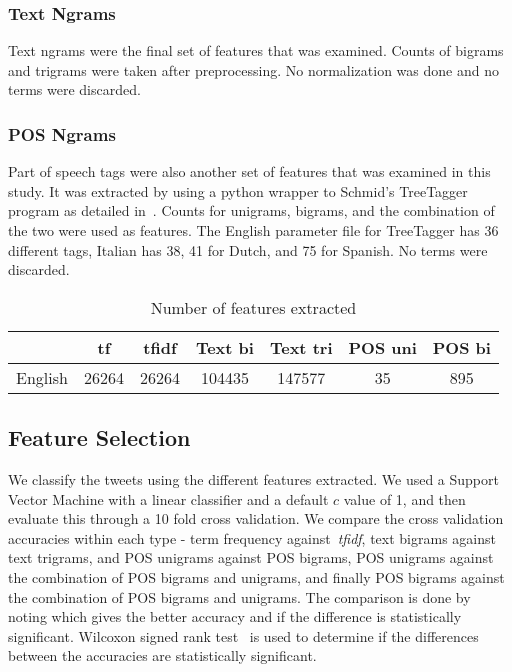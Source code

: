 \documentclass[a4paper]{llncs}
\begin{document}
\subsubsection{Text Ngrams}
Text ngrams were the final set of features that was examined. Counts of bigrams and trigrams were taken after preprocessing. No normalization was done and no terms were discarded. 

\subsubsection{POS Ngrams}
Part of speech tags were also another set of features that was examined in this study. It was extracted by using a python wrapper to Schmid's TreeTagger program as detailed in~\cite{schmid1994probabilistic}. Counts for unigrams, bigrams, and the combination of the two were used as features. The English parameter file for TreeTagger has 36 different tags, Italian has 38, 41 for Dutch, and 75 for Spanish. No terms were discarded.


\begin{table}[!htbp]
\centering
\begin{tabular}{|c|c|c|c|c|c|c|}
\hline
        & tf    & tfidf & Text  bi & Text tri & POS uni & POS bi \\ \hline
English & 26264 & 26264 & 104435   & 147577   & 35      & 895    \\ \hline
\end{tabular}
\caption{Number of features extracted}
\label{table:numFeatures}
\end{table}

\subsection{Feature Selection}

We classify the tweets using the different features extracted. We used a Support Vector Machine with a linear classifier and a default $c$ value of 1, and then evaluate this through a 10 fold cross validation. We compare the cross validation accuracies within each type - term frequency against~\textit{tfidf}, text bigrams against text trigrams, and POS unigrams against POS bigrams, POS unigrams against the combination of POS bigrams and unigrams, and finally POS bigrams against the combination of POS bigrams and unigrams. The comparison is done by noting which gives the better accuracy and if the difference is statistically significant. Wilcoxon signed rank test~\cite{wilcoxon1945individual} is used to determine if the differences between the accuracies are statistically significant. 
\end{document}
